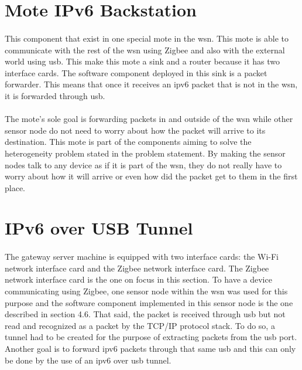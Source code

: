 \documentclass[oneside,12pt,a4paper,final]{book}
\begin{document}
\section{Mote IPv6 Backstation}
\paragraph{} 
This component that exist in one special mote in the \gls{wsn}. This mote is able to communicate with the rest of the \gls{wsn} using Zigbee and also with the external world using \gls{usb}. This make this mote a sink and a router because it has two interface cards. The software component deployed in this sink is a packet forwarder. This means that once it receives an \gls{ipv6} packet that is not in the \gls{wsn}, it is forwarded through \gls{usb}.
\paragraph{}
The mote's sole goal is forwarding packets in and outside of the \gls{wsn} while other sensor node do not need to worry about how the packet will arrive to its destination. This mote is part of the components aiming to solve the heterogeneity problem stated in the problem statement. By making the sensor nodes talk to any device as if it is part of the \gls{wsn}, they do not really have to worry about how it will arrive or even how did the packet get to them in the first place.

\section{IPv6 over USB Tunnel}
\paragraph{}
The gateway server machine is equipped with two interface cards: the Wi-Fi network interface card and the Zigbee network interface card. The Zigbee network interface card is the one on focus in this section. To have a device communicating using Zigbee, one sensor node within the \gls{wsn} was used for this purpose and the software component implemented in this sensor node is the one described in section 4.6. That said, the packet is received through \gls{usb} but not read and recognized as a packet by the TCP/IP protocol stack. To do so, a tunnel had to be created for the purpose of extracting packets from the \gls{usb} port. Another goal is to forward \gls{ipv6} packets through that same \gls{usb} and this can only be done by the use of an \gls{ipv6} over \gls{usb} tunnel. 
\end{document}
